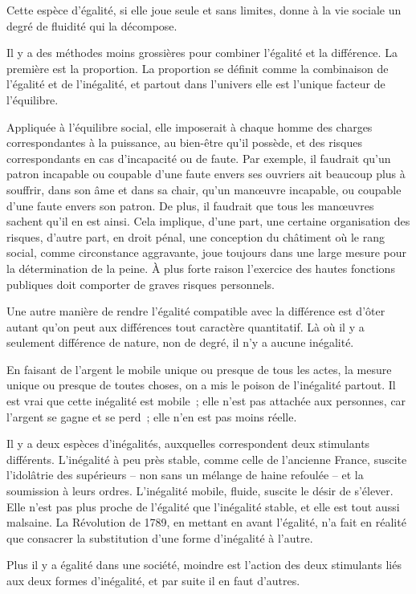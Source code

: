 \documentclass[french,twoside]{book} %
\begin{document}
Cette espèce d'égalité, si elle joue seule et sans limites, donne à la vie sociale un degré de fluidité qui la décompose.\par
Il y a des méthodes moins grossières pour combiner l'égalité et la différence. La première est la proportion. La proportion se définit comme la combinaison de l'égalité et de l'inégalité, et partout dans l'univers elle est l'unique facteur de l'équilibre.\par
Appliquée à l'équilibre social, elle imposerait à chaque homme des charges correspondantes à la puissance, au bien-être qu'il possède, et des risques correspondants en cas d'incapacité ou de faute. Par exemple, il faudrait qu'un patron incapable ou coupable d'une faute envers ses ouvriers ait beaucoup plus à souffrir, dans son âme et dans sa chair, qu'un manœuvre incapable, ou coupable d'une faute envers son patron. De plus, il faudrait que tous les manœuvres sachent qu'il en est ainsi. Cela implique, d'une part, une certaine organisation des risques, d'autre part, en droit pénal, une conception du châtiment où le rang social, comme circonstance aggravante, joue toujours dans une large mesure pour la détermination de la peine. À plus forte raison l'exercice des hautes fonctions publiques doit comporter de graves risques personnels.\par
Une autre manière de rendre l'égalité compatible avec la différence est d'ôter autant qu'on peut aux différences tout caractère quantitatif. Là où il y a seulement différence de nature, non de degré, il n'y a aucune inégalité.\par
En faisant de l'argent le mobile unique ou presque de tous les actes, la mesure unique ou presque de toutes choses, on a mis le poison de l'inégalité partout. Il est vrai que cette inégalité est mobile ; elle n'est pas attachée aux personnes, car l'argent se gagne et se perd ; elle n'en est pas moins réelle.\par
Il y a deux espèces d'inégalités, auxquelles correspondent deux stimulants différents. L'inégalité à peu près stable, comme celle de l'ancienne France, suscite l'idolâtrie des supérieurs – non sans un mélange de haine refoulée – et la soumission à leurs ordres. L'inégalité mobile, fluide, suscite le désir de s'élever. Elle n'est pas plus proche de l'égalité que l'inégalité stable, et elle est tout aussi malsaine. La Révolution de 1789, en mettant en avant l'égalité, n'a fait en réalité que consacrer la substitution d'une forme d'inégalité à l'autre.\par
Plus il y a égalité dans une société, moindre est l'action des deux stimulants liés aux deux formes d'inégalité, et par suite il en faut d'autres.\par
\end{document}
